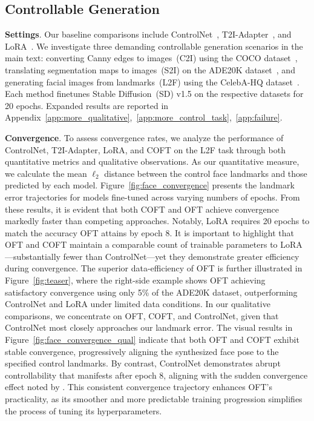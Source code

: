 \subsection{Controllable Generation}

\textbf{Settings}. Our baseline comparisons include ControlNet~\cite{zhang2023adding}, T2I-Adapter~\cite{mou2023t2i}, and LoRA~\cite{hulora2022}. We investigate three demanding controllable generation scenarios in the main text: converting Canny edges to images~(C2I) using the COCO dataset~\cite{lin2014microsoft}, translating segmentation maps to images~(S2I) on the ADE20K dataset~\cite{zhou2017scene}, and generating facial images from landmarks~(L2F) using the CelebA-HQ dataset~\cite{karras2018progressive,xia2021tedigan}. Each method finetunes Stable Diffusion~(SD) v1.5 on the respective datasets for 20 epochs. Expanded results are reported in Appendix~\ref{app:more_qualitative},~\ref{app:more_control_task},~\ref{app:failure}.

\textbf{Convergence}. To assess convergence rates, we analyze the performance of ControlNet, T2I-Adapter, LoRA, and COFT on the L2F task through both quantitative metrics and qualitative observations. As our quantitative measure, we calculate the mean $\ell_2$ distance between the control face landmarks and those predicted by each model. Figure~\ref{fig:face_convergence} presents the landmark error trajectories for models fine-tuned across varying numbers of epochs. From these results, it is evident that both COFT and OFT achieve convergence markedly faster than competing approaches. Notably, LoRA requires 20 epochs to match the accuracy OFT attains by epoch 8. It is important to highlight that OFT and COFT maintain a comparable count of trainable parameters to LoRA—substantially fewer than ControlNet—yet they demonstrate greater efficiency during convergence. The superior data-efficiency of OFT is further illustrated in Figure~\ref{fig:teaser}, where the right-side example shows OFT achieving satisfactory convergence using only 5\% of the ADE20K dataset, outperforming ControlNet and LoRA under limited data conditions. In our qualitative comparisons, we concentrate on OFT, COFT, and ControlNet, given that ControlNet most closely approaches our landmark error. The visual results in Figure~\ref{fig:face_convergence_qual} indicate that both OFT and COFT exhibit stable convergence, progressively aligning the synthesized face pose to the specified control landmarks. By contrast, ControlNet demonstrates abrupt controllability that manifests after epoch 8, aligning with the sudden convergence effect noted by \cite{zhang2023adding}. This consistent convergence trajectory enhances OFT’s practicality, as its smoother and more predictable training progression simplifies the process of tuning its hyperparameters.

